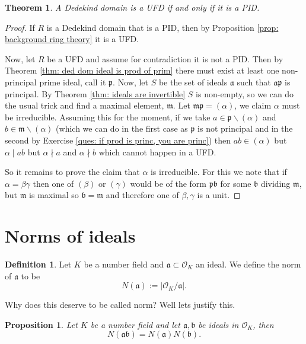 \documentclass[11pt,a4paper]{report}
\theoremstyle{plain}
\newtheorem{theorem}[subsection]{Theorem}
\newtheorem{prop}[subsection]{Proposition}
\theoremstyle{definition}
\newtheorem{definition}[subsection]{Definition}
\theoremstyle{definition}
\def\gothb{\mathfrak{b}}
\def\gothm{\mathfrak{m}}
\def\gothp{\mathfrak{p}}
\def \a{\alpha}
\def \OO {\mathcal{O}}
\def\gotha{\mathfrak{a}}
\begin{document}
	
	\begin{theorem}
		A Dedekind domain is a UFD if and only if it is a PID.
	\end{theorem}
	
	\begin{proof}
		If $R$ is a Dedekind domain that is a PID, then by Proposition \ref{prop: background ring theory} it is a UFD. 
		
		Now, let $R$ be a UFD and assume for contradiction it is not a PID. Then by Theorem \ref{thm: ded dom ideal is prod of prim} there must exist at least one non-principal prime ideal, call it $\gothp$. Now, let $S$ be the set of ideals $\gotha$ such that $\gotha \gothp$ is principal. By Theorem \ref{thm: ideals are invertible} $S$ is non-empty, so we can do the usual trick and find a maximal element, $\gothm$. Let $\gothm\gothp=(\a)$, we claim $\a$ must be irreducible. Assuming this for the moment, if we take $a \in \gothp \backslash (\a)$ and $b \in \gothm \backslash (\a)$ (which we can do in the first case as $\gothp$ is not principal and in the second by Exercise \ref{ques: if prod is princ, you are princ}) then $ab \in (\a)$ but $\a \mid ab$ but $\a \nmid a$ and $\a \nmid b$ which cannot happen in a UFD.
		
		So it remains to prove the claim that $\a$ is irreducible. For this we note that if $\a=\beta\gamma$ then one of $(\beta)$ or $(\gamma)$ would be of the form $\gothp\gothb$ for some $\gothb$ dividing $\gothm$, but $\gothm$ is maximal so $\gothb=\gothm$ and therefore one of $\beta,\gamma$ is a unit.
	\end{proof}
	
	
	\section{Norms of ideals}
	
	
	\begin{definition}
		Let $K$ be a number field and $\gotha \subset \OO_K$ an ideal. We define the norm of $\gotha$ to be \[N(\gotha):=|\OO_K / \gotha|.\]
	\end{definition}
	
	Why does this deserve to be called norm? Well lets justify this.
	
	\begin{prop}\label{prop: norm of ideal is mult}
		Let $K$ be a number field and let $\gotha,\gothb$ be ideals in $\OO_K$, then \[N(\gotha \gothb)=N(\gotha)N(\gothb).\]
	\end{prop}
	
\end{document}
